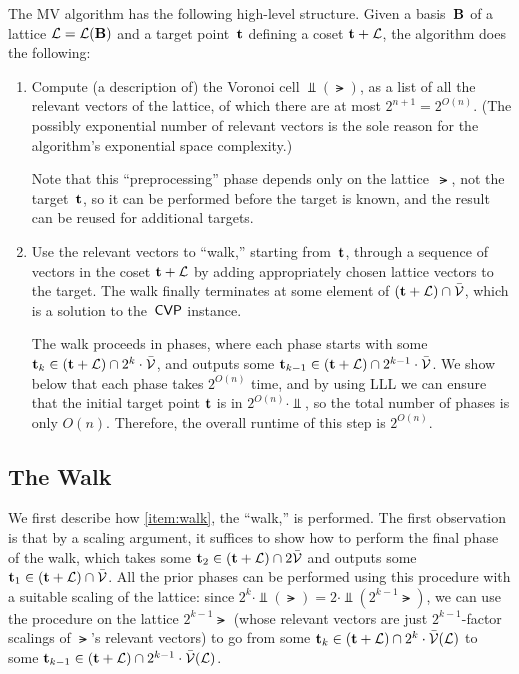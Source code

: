 \documentclass[11pt]{article}
\begin{document}
The MV algorithm has the following high-level structure. Given a
basis~$\mathbf{B}$ of a lattice $\mathcal{L} = \mathcal{L}(\mathbf{B})$ and a target
point~$\mathbf{t}$ defining a coset $\mathbf{t} + \mathcal{L}$, the algorithm does the
following:
\begin{enumerate}
\item Compute (a description of) the Voronoi cell $\Vbar(\lat)$, as a
  list of all the relevant vectors of the lattice, of which there are
  at most $2^{n+1} = 2^{O(n)}$. (The possibly exponential number of
  relevant vectors is the sole reason for the algorithm's exponential
  space complexity.)\label{item:compute-voronoi}

  Note that this ``preprocessing'' phase depends only on the
  lattice~$\lat$, not the target~$\mathbf{t}$, so it can be performed
  before the target is known, and the result can be reused for
  additional targets.

\item Use the relevant vectors to ``walk,'' starting from~$\mathbf{t}$,
  through a sequence of vectors in the coset $\mathbf{t}+\mathcal{L}$ by adding
  appropriately chosen lattice vectors to the target. The walk finally
  terminates at some element of $(\mathbf{t}+\mathcal{L}) \cap \bar{\mathcal{V}}$, which is a
  solution to the~$\mathsf{CVP}$ instance.\label{item:walk}

  The walk proceeds in phases, where each phase starts with some
  $\mathbf{t}_{k} \in (\mathbf{t}+\mathcal{L}) \cap 2^{k} \cdot \bar{\mathcal{V}}$, and outputs
  some $\mathbf{t}_{k-1} \in (\mathbf{t} + \mathcal{L}) \cap 2^{k-1} \cdot \bar{\mathcal{V}}$. We
  show below that each phase takes $2^{O(n)}$ time, and by using LLL
  we can ensure that the initial target point $\mathbf{t}$ is in
  $2^{O(n)} \cdot \Vbar$, so the total number of phases is only
  $O(n)$. Therefore, the overall runtime of this step is $2^{O(n)}$.
\end{enumerate}

\subsection{The Walk}
\label{sec:walk}

We first describe how \cref{item:walk}, the ``walk,'' is performed.
The first observation is that by a scaling argument, it suffices to
show how to perform the final phase of the walk, which takes some
$\mathbf{t}_{2} \in (\mathbf{t}+\mathcal{L}) \cap 2 \bar{\mathcal{V}}$ and outputs some
$\mathbf{t}_{1} \in (\mathbf{t}+\mathcal{L}) \cap \bar{\mathcal{V}}$. All the prior phases can be
performed using this procedure with a suitable scaling of the lattice:
since $2^{k} \cdot \Vbar(\lat) = 2 \cdot \Vbar(2^{k-1} \lat)$, we can
use the procedure on the lattice $2^{k-1} \lat$ (whose relevant
vectors are just $2^{k-1}$-factor scalings of $\lat$'s relevant
vectors) to go from some
$\mathbf{t}_{k} \in (\mathbf{t}+\mathcal{L}) \cap 2^{k} \cdot \bar{\mathcal{V}}(\mathcal{L})$ to some
$\mathbf{t}_{k-1} \in (\mathbf{t}+\mathcal{L}) \cap 2^{k-1} \cdot \bar{\mathcal{V}}(\mathcal{L})$.
\end{document}
